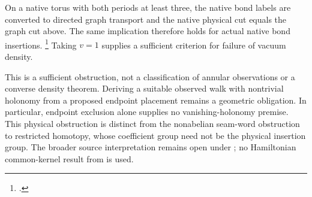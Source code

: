 \documentclass{article}
\begin{document}
On a native torus with both periods at least three, the native bond labels
are converted to directed graph transport and the native physical cut
equals the graph cut above. The same implication therefore holds for
actual native bond insertions.
\footnote{.}
Taking $v=1$ supplies a sufficient criterion for failure of vacuum density.

This is a sufficient obstruction, not a classification of annular
observations or a converse density theorem. Deriving a suitable observed
walk with nontrivial holonomy from a proposed endpoint placement remains
a geometric obligation. In particular, endpoint exclusion alone supplies
no vanishing-holonomy premise. This physical obstruction is distinct from
the nonabelian seam-word obstruction to restricted homotopy, whose
coefficient group need not be the physical insertion group.
The broader source interpretation remains open under ;
no Hamiltonian common-kernel result from  is used.



\end{document}
